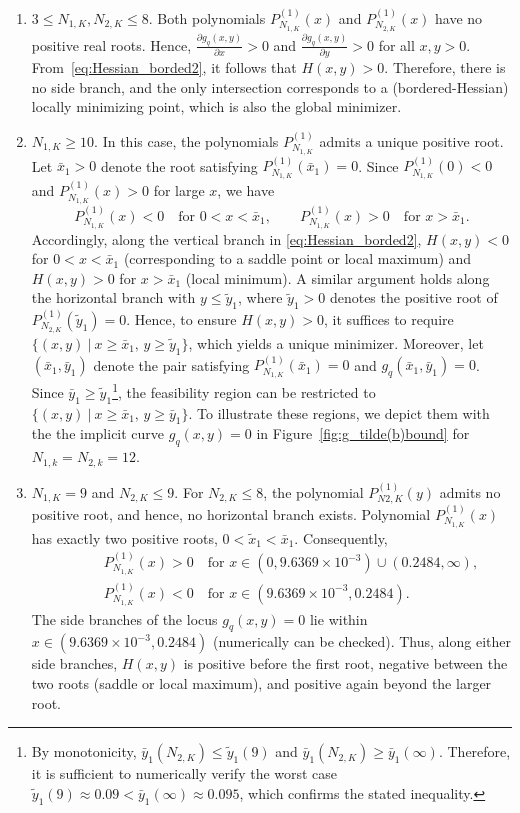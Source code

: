 \documentclass[journal,12pt,onecolumn,draftclsnofoot]{IEEEtran}
\theoremstyle{definition}
\begin{document}
\begin{enumerate}
\item {$3 \le N_{1,K}, N_{2,K} \le 8$.}  
Both polynomials $P^{(1)}_{N_{1,K}}(x)$ and $P^{(1)}_{N_{2,K}}(x)$ have no positive real roots. 
Hence, $\frac{\partial g_q(x,y)}{\partial x} > 0$ and $\frac{\partial g_q(x,y)}{\partial y} > 0$ for all $x, y > 0$. 
From~\eqref{eq:Hessian_borded2}, it follows that $H(x,y) > 0$. 
Therefore, there is no side branch, and the only intersection corresponds to a (bordered-Hessian) locally minimizing point, which is also the global minimizer.

\item {$N_{1,K} \ge 10$.}  
In this case, the polynomials $P^{(1)}_{N_{1,K}}$ admits a unique positive root. 
Let $\bar{x}_1 > 0$ denote the root satisfying $P^{(1)}_{N_{1,K}}(\bar{x}_1) = 0$.   
Since $P^{(1)}_{N_{1,K}}(0) < 0$ and $P^{(1)}_{N_{1,K}}(x) > 0$ for large $x$, we have
\[
P^{(1)}_{N_{1,K}}(x) < 0 \quad \text{for } 0 < x < \bar{x}_1, 
\qquad 
P^{(1)}_{N_{1,K}}(x) > 0 \quad \text{for } x > \bar{x}_1.
\]
Accordingly, along the vertical branch in \eqref{eq:Hessian_borded2}, $H(x,y) < 0$ for $0 < x < \bar{x}_1$ (corresponding to a saddle point or local maximum) and $H(x,y) > 0$ for $x > \bar{x}_1$ (local minimum).  A similar argument holds along the horizontal branch with $y\leq \tilde{y}_1 $, where $\tilde{y}_1 > 0$ denotes the positive root of $P^{(1)}_{N_{2,K}}(\tilde{y}_1) = 0$.  Hence, to ensure $H(x,y) > 0$, it suffices to require $\{(x,y)~|~x \ge \bar{x}_1,\, y \ge \tilde{y}_1\}$, which yields a unique minimizer.   Moreover, let $(\bar{x}_1, \bar{y}_1)$ denote the pair satisfying $P^{(1)}_{N_{1,K}}(\bar{x}_1) = 0$ and $g_q(\bar{x}_1, \bar{y}_1) = 0$.  
Since $\bar{y}_1 \ge \tilde{y}_1$\footnote{By monotonicity, 
$\bar{y}_1(N_{2,K}) \le \tilde{y}_1(9)$ and $\bar{y}_1(N_{2,K}) \ge \bar{y}_1(\infty)$.  
Therefore, it is sufficient to numerically verify the worst case $\tilde{y}_1(9) \approx0.09 < \bar{y}_1(\infty)\approx 0.095$, which confirms the stated inequality.}, 
the feasibility region can be restricted to $\{(x,y)~|~x \ge \bar{x}_1,\, y \ge \bar{y}_1\}$. To illustrate these regions, we depict them with the the implicit curve $g_q(x,y) =0$ in Figure~\ref{fig:g_tilde(b)bound} for $N_{1,k}=N_{2,k}=12$. 

\item {$N_{1,K} =9$ and $N_{2,K} \leq 9$.}  For $N_{2,K} \le 8$, the polynomial $P^{(1)}_{N{2,K}}(y)$ admits no positive root, and hence, no horizontal branch exists.   Polynomial $P^{(1)}_{N_{1,K}}(x)$ has exactly two positive roots, $0 < \tilde{x}_1 < \bar{x}_1$. Consequently, 
\begin{align*}
    & P^{(1)}_{N_{1,K}}(x) > 0 \quad \text{for } x \in (0, 9.6369\times 10^{-3}) \cup (0.2484, \infty), \\
    \qquad 
    & P^{(1)}_{N_{1,K}}(x) < 0 \quad \text{for } x \in (9.6369\times 10^{-3}, 0.2484).
\end{align*}
 The side branches of the locus $g_q(x,y)=0$ lie within $x\in (9.6369\times 10^{-3}, 0.2484)$ (numerically can be checked).   Thus, along either side branches, $H(x,y)$ is positive before the first root, negative between the two roots (saddle or local maximum), and positive again beyond the larger root.  


\end{enumerate}
\end{document}
